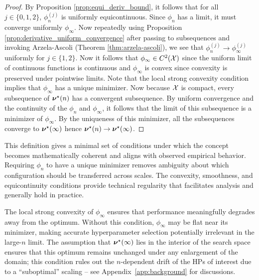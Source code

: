 \begin{proof}
By Proposition \ref{prop:equi_deriv_bound}, it follows that for all $j \in \{0, 1, 2\}$, ${\phi_n^{(j)}}$ is uniformly equicontinuous. Since $\phi_n$ has a limit, it must converge uniformly $\phi_\infty$. Now repeatedly using Proposition \ref{prop:derivative_uniform_convergence} after passing to subsequences and invoking Arzela-Ascoli (Theorem \ref{thm:arzela-ascoli}), we see that $\phi_n^{(j)} \to \phi_\infty^{(j)}$ uniformly for $j \in \{1, 2\}$. Now it follows that $\phi_\infty \in C^2(\mathcal{X})$ since the uniform limit of continuous functions is continuous and $\phi_\infty$ is convex since convexity is preserved under pointwise limits. Note that the local strong convexity condition implies that $\phi_\infty$ has a unique minimizer. Now because $\mathcal{X}$ is compact, every subsequence of $\bm{\nu}^\star(n)$ has a convergent subsequence. By uniform convergence and the continuity of the $\phi_n$ and $\phi_\infty$, it follows that the limit of this subsequence is a minimizer of $\phi_\infty$. By the uniqueness of this minimizer, all the subsequences converge to $\bm{\nu}^\star(\infty)$ hence $\bm{\nu}^\star(n) \to \bm{\nu}^\star(\infty)$.
\end{proof}

This definition gives a minimal set of conditions under which the concept becomes mathematically coherent and aligns with observed empirical behavior. Requiring $\phi_n$ to have a unique minimizer removes ambiguity about which configuration should be transferred across scales. The convexity, smoothness, and equicontinuity conditions provide technical regularity that facilitates analysis and generally hold in practice.

The local strong convexity of $\phi_\infty$ ensures that performance meaningfully degrades away from the optimum. Without this condition, $\phi_\infty$ may be flat near its minimizer, making accurate hyperparameter selection potentially irrelevant in the large-$n$ limit. The assumption that $\bm{\nu}^\star(\infty)$ lies in the interior of the search space ensures that this optimum remains unchanged under any enlargement of the domain; this condition rules out the $n$-dependent drift of the HPs of interest due to a ``suboptimal'' scaling -- see Appendix~\ref{app:background} for discussions. 

